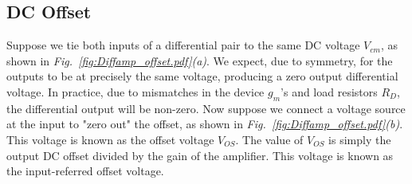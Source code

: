\subsection{DC Offset}
Suppose we tie both inputs of a differential pair to the same DC voltage $V_{cm}$, as shown in \emph{Fig.~\ref{fig:Diffamp_offset.pdf}(a)}.  We expect, due to symmetry, for the outputs to be at precisely the same voltage, producing a zero output differential voltage.  In practice, due to mismatches in the device $g_m$'s and load resistors $R_D$, the differential output will be non-zero.  Now suppose we connect a voltage source at the input to "zero out" the offset, as shown in \emph{Fig.~\ref{fig:Diffamp_offset.pdf}(b)}.  This voltage is known as the offset voltage $V_{OS}$.  The value of $V_{OS}$ is simply the output DC offset divided by the gain of the amplifier.  This voltage is known as the input-referred offset voltage.
